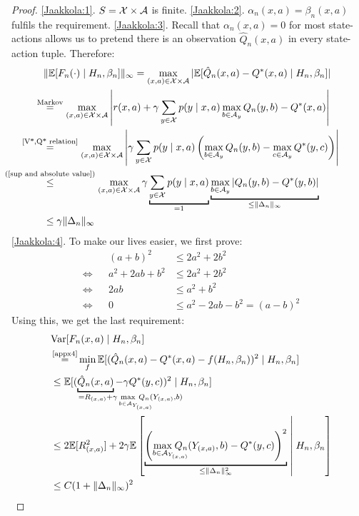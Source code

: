 \begin{proof}
    \ref{Jaakkola:1}. \(S=\mathcal{X}\times\mathcal{A}\) is finite.
    \ref{Jaakkola:2}. \(\alpha_n(x,a)=\beta_n(x,a)\) fulfils the requirement.
    \ref{Jaakkola:3}. Recall that \(\alpha_n(x,a)=0\) for most state-actions allows us to pretend there is an observation \(\hat{Q}_n(x,a)\) in every state-action tuple. Therefore:
    \begin{align*}
        &\|\E[F_n(\cdot)\mid H_n, \beta_n]\|_\infty
        =\max_{(x,a)\in\cX\times\cA} |\E[\hat{Q}_n(x,a)-Q^*(x,a)\mid H_n, \beta_n]|\\
        &\lxeq{\text{Markov}}\max_{(x,a)\in\cX\times\cA}
        \left|r(x,a)+\gamma\sum_{y\in\cX}p(y\mid x,a)\max_{b\in\cA_y}Q_n(y,b) -Q^*(x,a)\right|\\
        &\lxeq{\text{\ref{V*,Q* relation}}}\max_{(x,a)\in\cX\times\cA}
        \left|\gamma\sum_{y\in\cX}p(y\mid x,a)\left(
            \max_{b\in\cA_y}Q_n(y,b) - \max_{c\in\cA_y}Q^*(y,c) 
        \right)\right|\\
        &\lxlq{\text{(\ref{sup and absolute value})}} \max_{(x,a)\in\cX\times\cA} \gamma \underbracket[1pt]{\sum_{y\in\cX}p(y\mid x,a)}_{=1}  
        \underbracket[1pt]{
            \max_{b\in\cA_y}\left|Q_n(y,b)-Q^*(y,b)\right|
        }_{\le \|\Delta_n\|_\infty}\\
        &\le \gamma \|\Delta_n\|_\infty
    \end{align*}
\ref{Jaakkola:4}. To make our lives easier, we first prove:
\begin{align}
    && (a+b)^2 &\le 2a^2+2b^2\\
    \iff&& a^2+2ab +b^2 &\le 2a^2+2b^2\nonumber\\
    \iff&& 2ab &\le a^2 + b^2 \nonumber\\
    \iff&& 0 &\le a^2 -2ab -b^2 = (a-b)^2 \nonumber
\end{align}
Using this, we get the last requirement:
\begin{align*}
    &\text{Var}[F_n(x,a)\mid H_n,\beta_n]\\
    &\xeq{\text{\ref{appx4}}}\min_{f} \E[(\hat{Q}_n(x,a)-Q^*(x,a) -f(H_n,\beta_n))^2\mid H_n, \beta_n ]\\
    &\le \E[(\underbracket[1pt]{\hat{Q}_n(x,a)}_{
        =R_{(x,a)} + \mathrlap{\gamma \max\limits_{b\in\cA_{Y_{\mathrlap{(x,a)}}}}Q_n(Y_{(x,a)}, b)}
    }-\gamma Q^*(y,c))^2\mid H_n, \beta_n ]\\
    &\le 2\E[ R_{(x,a)}^2] 
    + 2\gamma \E\left[
        \underbracket[1pt]{
        \left(
            \max\limits_{b\in\cA_{Y_{\mathrlap{(x,a)}}}}
            Q_n(Y_{(x,a)}, b)-Q^*(y,c)
        \right)^2 
        }_{
        \le \|\Delta_n\|_\infty^2
    }\;\middle|\; H_n,\beta_n \right] \\
    &\le C(1+\|\Delta_n\|_\infty)^2\qedhere
\end{align*}
\end{proof}


